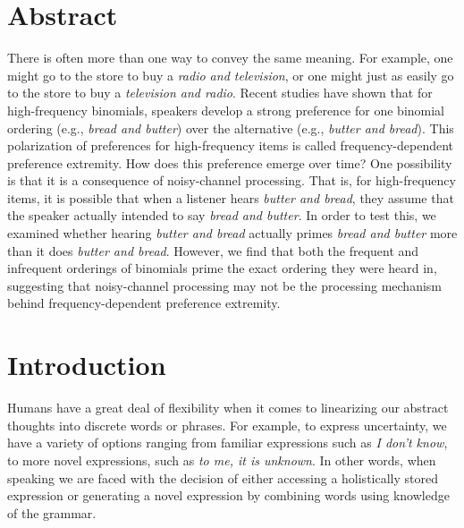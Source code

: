 \documentclass[
  12pt,
]{scrartcl}
\renewcommand*\contentsname{Table of contents}
\newcommand\contentsname{Table of contents}
\begin{document}
\setcounter{page}{\value{savedpage}} %
\clearpage

\renewcommand*\contentsname{Table of contents}
{
\setcounter{tocdepth}{3}
\tableofcontents
}

\newpage

\doublespacing

\setlength{\parindent}{4em}

\section*{Abstract}\label{sec-abstract}

There is often more than one way to convey the same meaning. For
example, one might go to the store to buy a \emph{radio and television},
or one might just as easily go to the store to buy a \emph{television
and radio}. Recent studies have shown that for high-frequency binomials,
speakers develop a strong preference for one binomial ordering (e.g.,
\emph{bread and butter}) over the alternative (e.g., \emph{butter and
bread}). This polarization of preferences for high-frequency items is
called frequency-dependent preference extremity. How does this
preference emerge over time? One possibility is that it is a consequence
of noisy-channel processing. That is, for high-frequency items, it is
possible that when a listener hears \emph{butter and bread}, they assume
that the speaker actually intended to say \emph{bread and butter}. In
order to test this, we examined whether hearing \emph{butter and bread}
actually primes \emph{bread and butter} more than it does \emph{butter
and bread}. However, we find that both the frequent and infrequent
orderings of binomials prime the exact ordering they were heard in,
suggesting that noisy-channel processing may not be the processing
mechanism behind frequency-dependent preference extremity.

\newpage


\section{Introduction}\label{introduction}

Humans have a great deal of flexibility when it comes to linearizing our
abstract thoughts into discrete words or phrases. For example, to
express uncertainty, we have a variety of options ranging from familiar
expressions such as \emph{I don't know}, to more novel expressions, such
as \emph{to me, it is unknown}. In other words, when speaking we are
faced with the decision of either accessing a holistically stored
expression or generating a novel expression by combining words using
knowledge of the grammar.
\end{document}
